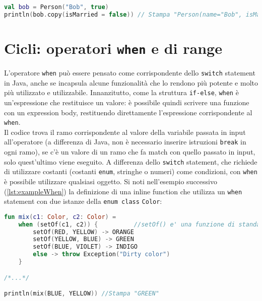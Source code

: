 \begin{lstlisting}[caption={Utilizzo della funzione \texttt{copy}}, captionpos=b, label={lst:exampleCopy}, language=Kotlin]
val bob = Person("Bob", true)
println(bob.copy(isMarried = false)) // Stampa "Person(name="Bob", isMarried=false)"
\end{lstlisting}

\section{Cicli: operatori \texttt{when} e di range}

L’operatore \texttt{when} può essere pensato come corrispondente dello \texttt{switch} statement in Java, anche se incapsula alcune funzionalità che lo rendono più potente e molto più utilizzato e utilizzabile. Innanzitutto, come la struttura \texttt{if-else}, \texttt{when} è un'espressione che restituisce un valore: è possibile quindi scrivere una funzione con un expression body, restituendo direttamente l'espressione corrispondente al \texttt{when}.\\
Il codice trova il ramo corrispondente al valore della variabile passata in input all’operatore (a differenza di Java, non è necessario inserire istruzioni \texttt{break} in ogni ramo), se c’è un valore di un ramo che fa match con quello passato in input, solo quest’ultimo viene eseguito. A differenza dello \texttt{switch} statement, che richiede di utilizzare costanti (costanti \texttt{enum}, stringhe o numeri) come condizioni, con \texttt{when} è possibile utilizzare qualsiasi oggetto. Si noti nell'esempio successivo (\ref{lst:exampleWhen}) la definizione di una inline function che utilizza un \texttt{when} statement con due istanze della \texttt{enum class} \texttt{Color}:\\

\begin{lstlisting}[caption={Il costrutto \texttt{when}}, captionpos=b, label={lst:exampleWhen}, language=Kotlin]
fun mix(c1: Color, c2: Color) =
    when (setOf(c1, c2)) {          //setOf() e' una funzione di standard library
        setOf(RED, YELLOW) -> ORANGE
        setOf(YELLOW, BLUE) -> GREEN
        setOf(BLUE, VIOLET) -> INDIGO
        else -> throw Exception("Dirty color")
    }

/*...*/

println(mix(BLUE, YELLOW)) //Stampa "GREEN"
\end{lstlisting}

